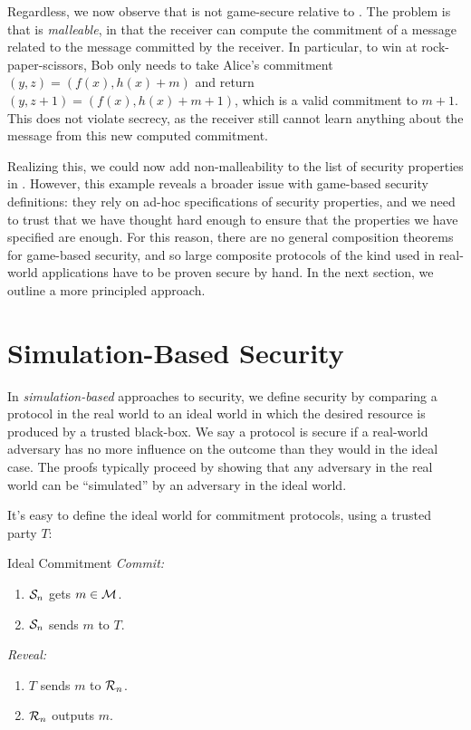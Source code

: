 Regardless, we now observe that  is not
game-secure relative to . The problem is that
 is \emph{malleable}, in that the receiver can compute the
commitment of a message related to the message committed by the receiver. In
particular, to win at rock-paper-scissors, Bob only needs to take Alice's
commitment $(y, z) = (f(x), h(x) + m)$ and return $(y, z+1) = (f(x), h(x) + m +
	1)$, which is a valid commitment to $m+1$. This does not violate secrecy, as the
receiver still cannot learn anything about the message from this new computed
commitment.

Realizing this, we could now add non-malleability to the list of security
properties in . However, this example reveals a
broader issue with game-based security definitions: they rely on ad-hoc
specifications of security properties, and we need to trust that we have thought
hard enough to ensure that the properties we have specified are enough. For this
reason, there are no general composition theorems for game-based security, and
so large composite protocols of the kind used in real-world applications have to
be proven secure by hand. In the next section, we outline a more principled
approach.


\section{Simulation-Based Security}

In \emph{simulation-based} approaches to security, we define security by
comparing a protocol in the real world to an ideal world in which the desired
resource is produced by a trusted black-box. We say a protocol is secure if a
real-world adversary has no more influence on the outcome than they would in the
ideal case. The proofs typically proceed by showing that any adversary in the
real world can be ``simulated'' by an adversary in the ideal world.

It's easy to define the ideal world for commitment protocols, using a trusted
party $T$:

\begin{prot}{Ideal Commitment}\label{prot:ideal commitment}
	\newline
	\emph{Commit:}
	\begin{enumerate}[itemsep=-0.2em,topsep=-0.2em]
		\item $\mathcal{S}_n$ gets $m\in\mathcal{M}$.
		\item $\mathcal{S}_n$ sends $m$ to $T$.
	\end{enumerate}
	\vspace{1em}
	\emph{Reveal:}
	\begin{enumerate}[itemsep=-0.2em,topsep=-0.2em]
		\item $T$ sends $m$ to $\mathcal{R}_n$.
		\item $\mathcal{R}_n$ outputs $m$.
	\end{enumerate}
\end{prot}

